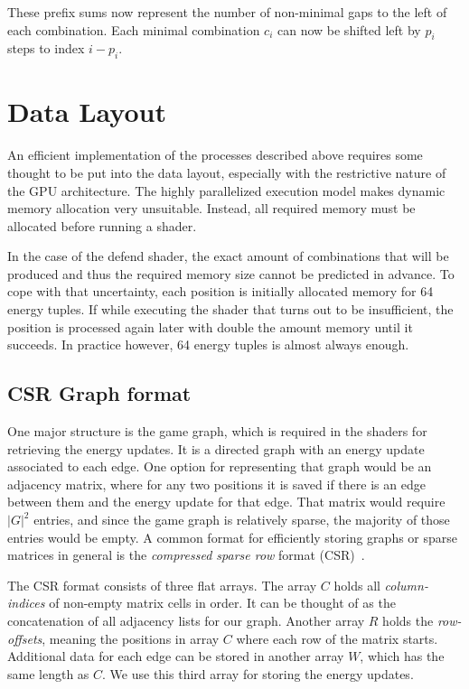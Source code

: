These prefix sums now represent the number of non-minimal gaps to the left of
each combination.
Each minimal combination $c_i$ can now be shifted left by $p_i$ steps to index
$i - p_i$.


\section{Data Layout}

An efficient implementation of the processes described above requires some
thought to be put into the data layout,
especially with the restrictive nature of the GPU architecture.
The highly parallelized execution model makes dynamic memory allocation very
unsuitable.
Instead, all required memory must be allocated before running a shader.

In the case of the defend shader, the exact amount of combinations that will be
produced and thus the required memory size cannot be predicted in advance.
To cope with that uncertainty, each position is initially allocated memory for
64 energy tuples.
If while executing the shader that turns out to be insufficient,
the position is processed again later with double the amount memory until it
succeeds.
In practice however, 64 energy tuples is almost always enough.


\subsection{CSR Graph format}

One major structure is the game graph,
which is required in the shaders for retrieving the energy updates.
It is a directed graph with an energy update associated to each edge.
One option for representing that graph would be an adjacency matrix,
where for any two positions it is saved if there is an edge between them
and the energy update for that edge.
That matrix would require $|G|^2$ entries, and since the game graph is
relatively sparse, the majority of those entries would be empty.
A common format for efficiently storing graphs or sparse matrices in general is
the \emph{compressed sparse row} format (CSR)~\cite{Merrill2015}\cite{Hijma2023}.

The CSR format consists of three flat arrays.
The array $C$ holds all \emph{column-indices} of non-empty matrix cells in order.
It can be thought of as the concatenation of all adjacency lists for our graph.
Another array $R$ holds the \emph{row-offsets}, meaning the positions in array
$C$ where each row of the matrix starts.
Additional data for each edge can be stored in another array $W$, which has the
same length as $C$.
We use this third array for storing the energy updates.


